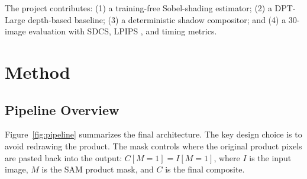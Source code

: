 \documentclass{article}
\begin{document}
The project contributes: (1) a training-free Sobel-shading estimator; (2) a DPT-Large \citep{ranftl2021dpt} depth-based baseline; (3) a deterministic shadow compositor; and (4) a 30-image evaluation with SDCS, LPIPS \citep{zhang2018lpips}, and timing metrics.

\section{Method}

\subsection{Pipeline Overview}
Figure~\ref{fig:pipeline} summarizes the final architecture. The key design choice is to avoid redrawing the product. The mask controls where the original product pixels are pasted back into the output: $C[M = 1] = I[M = 1]$, where $I$ is the input image, $M$ is the SAM product mask, and $C$ is the final composite.
\end{document}
